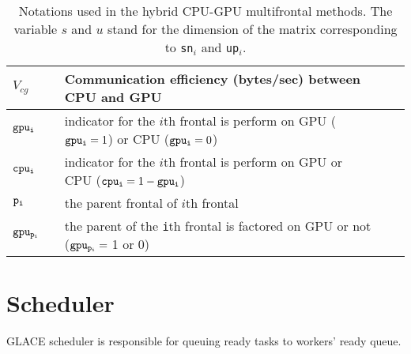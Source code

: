 \documentclass[preprint,11pt]{elsarticle}
\begin{document}
\begin{table}
{\begin{tabular}{lllll}
    {\tt $V_{cg}$} && Communication efficiency (bytes/sec) between CPU and GPU \\ \hline

    ${\tt gpu_i}$ && indicator for the $i$th frontal is perform on GPU
(${\tt gpu_i}=1$) or CPU (${\tt gpu_i}=0$)\\
    ${\tt cpu_i}$ && indicator for the $i$th frontal is perform on GPU or CPU (${\tt cpu_i}=1-{\tt gpu_i}$)\\
    ${\tt p_i}$ && the parent frontal of $i$th frontal\\
    ${\tt gpu_{p_i}}$ &&  the parent of the {\tt i}th frontal is factored on GPU or not (${\tt gpu_{p_i}}=$ 1 or 0)\\
    \hline
  \end{tabular}
}
\caption{Notations used in the hybrid CPU-GPU multifrontal methods.
  The variable $s$ and $u$ stand for the dimension of the matrix corresponding 
  to {\tt sn$_i$} and {\tt up$_i$}.}
  \label{tab:notation}
\end{table}

\section{Scheduler}
  GLACE scheduler is responsible for queuing ready tasks to workers' ready queue. 
\end{document}
